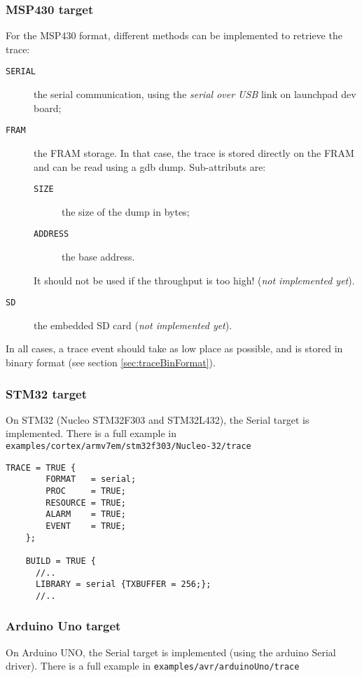 \subsubsection{MSP430 target}
For the MSP430 format, different methods can be implemented to retrieve the trace:
\begin{description}
	\item[\texttt{SERIAL}] the serial communication, using the \emph{serial over USB} link on launchpad dev board;
	\item[\texttt{FRAM}] the FRAM storage. In that case, the trace is stored directly on the FRAM and can be read using a gdb dump. Sub-attributs are:
\begin{description}
	\item[\texttt{SIZE}] the size of the dump in bytes;
	\item[\texttt{ADDRESS}] the base address.
\end{description} It should not be used if the throughput is too high!
(\emph{not implemented yet}).

	\item[\texttt{SD}] the embedded SD card (\emph{not implemented yet}).
\end{description}

In all cases, a trace event should take as low place as possible, and is stored in binary format (see section \ref{sec:traceBinFormat}).

\subsubsection{STM32 target}
On STM32 (Nucleo STM32F303 and STM32L432), the Serial target is implemented. There is a full example in \texttt{examples/cortex/armv7em/stm32f303/Nucleo-32/trace}

\begin{lstlisting}[language=OIL]
    TRACE = TRUE {
        FORMAT   = serial;
        PROC     = TRUE;
        RESOURCE = TRUE;
        ALARM    = TRUE;
        EVENT    = TRUE;
    };
    
    BUILD = TRUE {
	  //..
      LIBRARY = serial {TXBUFFER = 256;};
	  //..

\end{lstlisting}

\subsubsection{Arduino Uno target}
On Arduino UNO, the Serial target is implemented (using the arduino Serial driver).
There is a full example in \texttt{examples/avr/arduinoUno/trace}

